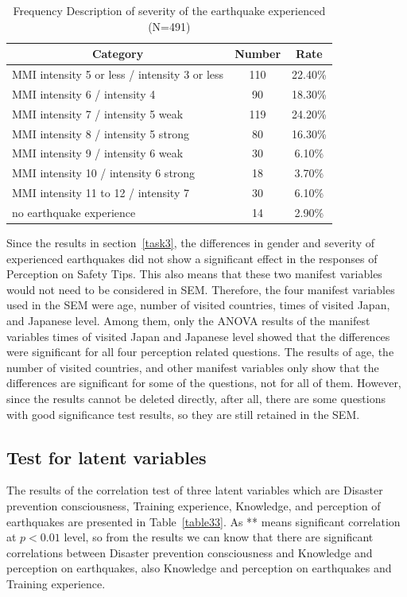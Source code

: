 \begin{table}[h]
  \caption[Frequency Description of severity of the earthquake experienced]{Frequency Description of severity of the earthquake experienced (N=491)}
  \label{table28g}
  \centering
  \begin{tabular}{l|cc}
 \hline
\multicolumn{1}{c|}{Category}&Number&Rate\\
 \hline
MMI intensity 5 or less / intensity 3 or less & 110 & 22.40\% \\
MMI intensity 6 / intensity 4                 & 90  & 18.30\% \\
MMI intensity 7 / intensity 5 weak            & 119 & 24.20\% \\
MMI intensity 8 / intensity 5 strong          & 80  & 16.30\% \\
MMI intensity 9 / intensity 6 weak            & 30  & 6.10\%  \\
MMI intensity 10 / intensity 6 strong                                 & 18  & 3.70\%  \\
MMI intensity 11 to 12 / intensity 7                                  & 30  & 6.10\%  \\
no earthquake experience                                              & 14  & 2.90\%  \\
 \hline
  \end{tabular}
\end{table}

Since the results in section~\ref{task3}, the differences in gender and severity of experienced earthquakes did not show a significant effect in the responses of Perception on Safety Tips. This also means that these two manifest variables would not need to be considered in SEM. Therefore, the four manifest variables used in the SEM were age, number of visited countries, times of visited Japan, and Japanese level. Among them, only the ANOVA results of the manifest variables times of visited Japan and Japanese level showed that the differences were significant for all four perception related questions. The results of age, the number of visited countries, and other manifest variables only show that the differences are significant for some of the questions, not for all of them. However, since the results cannot be deleted directly, after all, there are some questions with good significance test results, so they are still retained in the SEM.

\subsection{Test for latent variables }
The results of the correlation test of three latent variables which are Disaster prevention consciousness, Training experience, Knowledge, and perception of earthquakes are presented in Table~\ref{table33}. As ** means significant correlation at $p<0.01$ level, so from the results we can know that there are significant correlations between Disaster prevention consciousness and Knowledge and perception on earthquakes, also Knowledge and perception on earthquakes and Training experience.

